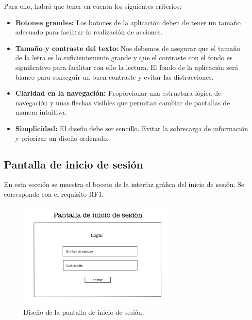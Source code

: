 Para ello, habrá que tener en cuenta los siguientes criterios:

\begin{itemize}
	\item \textbf{Botones grandes:} Los botones de la aplicación deben de tener un tamaño adecuado para facilitar la realización de acciones. 
	\item \textbf{Tamaño y contraste del texto:} Nos debemos de asegurar que el tamaño de la letra es lo suficientemente grande y que el contraste con el fondo es significativo para facilitar con ello la lectura. El fondo de la aplicación será blanco para conseguir un buen contraste y evitar las distracciones. 
	\item \textbf{Claridad en la navegación:} Proporcionar una estructura lógica de navegación y unas flechas visibles que permitan cambiar de pantallas de manera intuitiva. 
	\item \textbf{Simplicidad:} El diseño debe ser sencillo. Evitar la sobrecarga de información y priorizar un diseño ordenado. 
\end{itemize} 

\newpage

\subsection{Pantalla de inicio de sesión}

En esta sección se muestra el boceto de la interfaz gráfica del inicio de sesión. Se corresponde con el requisito RF1. 

\begin{figure}[ht]
	\centering
	\includegraphics[width=0.7\textwidth, angle=270]{imagenes/inicio_sesion.JPG}
	\caption{Diseño de la pantalla de inicio de sesión.}
	\label{fig:iniciosesion}
\end{figure}

\newpage

